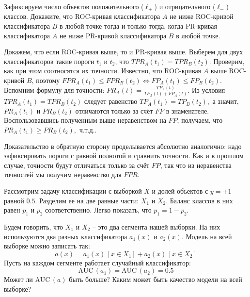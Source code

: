 \documentclass[12pt,a4paper]{article}
\begin{document}
\begin{vkProblem}
Зафиксируем число объектов положительного ($\ell_{+}$) и отрицательного ($\ell_{-}$) классов.
Докажите, что ROC-кривая классификатора $A$ не ниже ROC-кривой классификатора $B$ в любой точке тогда и только тогда, когда PR-кривая классификатора $A$ не ниже PR-кривой классификатора $B$ в любой точке.
\end{vkProblem}

\begin{esSolution}
Докажем, что если ROC-кривая выше, то и PR-кривая выше.
Выберем для двух классификаторов такие пороги $t_1$ и $t_2$, что $TPR_A(t_1) = TPR_B(t_2).$
Проверим, как при этом соотносятся их точности.
Известно, что ROC-кривая $A$ выше ROC-кривой $B$, поэтому $FPR_A(t_1) \leqslant FPR_B(t_2) \Leftrightarrow FP_A(t_1) \leqslant FP_B(t_2).$
Вспомним формулу для точности: $PR_A(t) = \frac{TP_A(t)}{TP_A(t) + FP_A(t)}.$
Из условия $TPR_A(t_1) = TPR_B(t_2)$ следует равенство $TP_A(t_1) = TP_B(t_2),$ а значит, $PR_A(t_1)$ и $PR_B(t_2)$ отличаются только за счёт $FP$ в знаменателе.
Воспользовавшись полученным выше неравенством на $FP$, получаем, что $PR_A(t_1) \geqslant PR_B(t_2),$ ч.т.д.. 

Доказательство в обратную сторону проделывается абсолютно аналогично: надо зафиксировать пороги с равной полнотой и сравнить точности.
Как и в прошлом случае, точности будут отличаться только за счёт $FP$, так что из неравенства точностей мы получим неравенство для $FPR$.
\end{esSolution}

\begin{vkProblem}
	Рассмотрим задачу классификации с выборкой $X$ и долей объектов с $ y = + 1 $ равной $ 0.5 $.
	Разделим ее на две равные части: $ X_1 $ и $ X_2 $.
	Баланс классов в них равен $ p_1 $ и $ p_2 $ соответственно.
	Легко показать, что $ p_1 = 1 - p_2 $.
	
	Будем говорить, что $ X_1 $ и $ X_2 $ – это два сегмента нашей выборки.
	На них используются два разных классификатора $ a_1(x) $ и $ a_2(x) $.
	Модель на всей выборке можно записать так:
	$$
		a(x) = a_1(x)\,\left[x \in X_1\right] + a_2(x)\,\left[x \in X_2\right]
	$$
	Пусть на каждом сегменте работает случайный классификатор:
	$$
		\text{AUC}\,(a_1) = \text{AUC}\,(a_2) = 0.5
	$$
	Может ли $ \text{AUC}\,(a) $ быть больше?
	Каким может быть качество модели на всей выборке?
\end{vkProblem}
\end{document}
